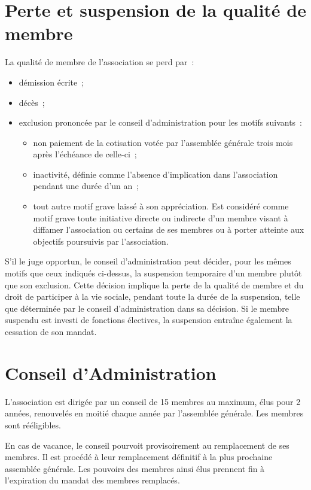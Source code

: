 \documentclass[12 pt]{article}
\begin{document}
\section{Perte et suspension de la qualité de membre}
\label{sec:perte-et-suspension-de-la-qualite-de-membre}

La qualité de membre de l'association se perd par :

\begin{itemize}
\item démission écrite~;
\item décès~;
\item exclusion prononcée par le conseil d'administration pour les
  motifs suivants~:
  \begin{itemize}
  \item non paiement de la cotisation votée par l'assemblée générale
    trois mois après l'échéance de celle-ci~;
  \item inactivité, définie comme l'absence d'implication dans
    l'association pendant une durée d'un an~;
  \item tout autre motif grave laissé à son appréciation. Est
    considéré comme motif grave toute initiative directe ou indirecte
    d'un membre visant à diffamer l'association ou certains de ses
    membres ou à porter atteinte aux objectifs poursuivis par
    l'association.
  \end{itemize}
\end{itemize}

S'il le juge opportun, le conseil d'administration peut décider, pour
les mêmes motifs que ceux indiqués ci-dessus, la suspension temporaire
d'un membre plutôt que son exclusion.  Cette décision implique la
perte de la qualité de membre et du droit de participer à la vie
sociale, pendant toute la durée de la suspension, telle que déterminée
par le conseil d'administration dans sa décision. Si le membre
suspendu est investi de fonctions électives, la suspension entraîne
également la cessation de son mandat.

\section{Conseil d'Administration}
\label{sec:administration}

L’association est dirigée par un conseil de 15 membres au maximum,
élus pour 2 années, renouvelés en moitié chaque année par l’assemblée
générale. Les membres sont rééligibles.

En cas de vacance, le conseil pourvoit provisoirement au remplacement
de ses membres. Il est procédé à leur remplacement définitif à la
plus prochaine assemblée générale. Les pouvoirs des membres ainsi élus
prennent fin à l’expiration du mandat des membres remplacés.
\end{document}
